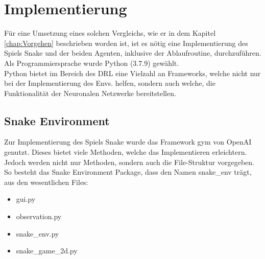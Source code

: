 \chapter{Implementierung}
Für eine Umsetzung eines solchen Vergleichs, wie er in dem Kapitel \ref{chap:Vorgehen} beschrieben worden ist, ist es nötig eine Implementierung des Spiels Snake und der beiden Agenten, inklusive der Ablaufroutine, durchzuführen. Als Programmiersprache wurde Python (3.7.9) gewählt.\\
Python bietet im Bereich des DRL eine Vielzahl an Frameworks, welche nicht nur bei der Implementierung des Envs. helfen, sondern auch welche, die Funktionalität der Neuronalen Netzwerke bereitstellen.

\section{Snake Environment}
Zur Implementierung des Spiels Snake wurde das Framework gym von OpenAI genutzt. Dieses bietet viele Methoden, welche das Implementieren erleichtern. Jedoch werden nicht nur Methoden, sondern auch die File-Struktur vorgegeben. So besteht das Snake Environment Package, dass den Namen snake\_env trägt, aus den wesentlichen Files:

\begin{itemize}
	\item gui.py
	\item observation.py
	\item snake\_env.py
	\item snake\_game\_2d.py
\end{itemize}

